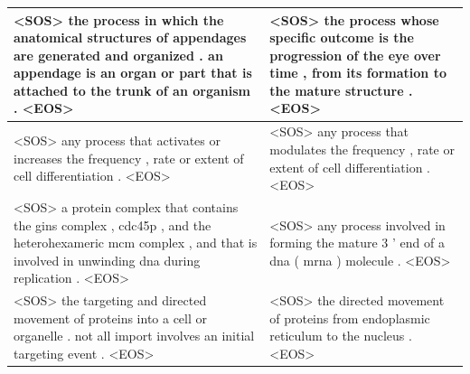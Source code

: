 \documentclass{specification}
\begin{document}
\begin{enumerate}
\begin{table}
\begin{tabular}{p{8 cm}|p{8 cm}}
		\midrule
        <SOS> the process in which the anatomical structures of appendages are generated and organized . an appendage is an organ or part that is attached to the trunk of an organism . <EOS> & <SOS> the process whose specific outcome is the progression of the eye over time , from its formation to the mature structure . <EOS> \\ \hline
        <SOS> any process that activates or increases the frequency , rate or extent of cell differentiation . <EOS> & <SOS> any process that modulates the frequency , rate or extent of cell differentiation . <EOS> \\ \hline
		<SOS> a protein complex that contains the gins complex , cdc45p , and the heterohexameric mcm complex , and that is involved in unwinding dna during replication . <EOS> & <SOS> any process involved in forming the mature 3 ' end of a dna ( mrna ) molecule . <EOS> \\
        \hline
        <SOS> the targeting and directed movement of proteins into a cell or organelle . not all import involves an initial targeting event . <EOS> & <SOS> the directed movement of proteins from endoplasmic reticulum to the nucleus . <EOS>  \\
		\bottomrule
	\end{tabular}
\end{table}

\end{enumerate}
\end{document}
